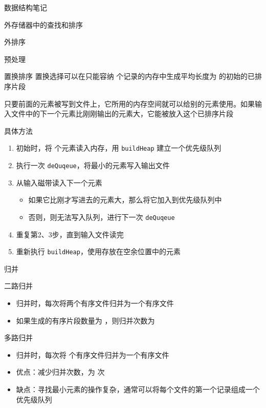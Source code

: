 \documentclass[
  ignorenonframetext,
]{beamer}
\providecommand{\tightlist}{%
  \setlength{\itemsep}{0pt}\setlength{\parskip}{0pt}}
\begin{document}
\begin{frame}[fragile]{数据结构笔记}
\begin{block}{外存储器中的查找和排序}
\begin{block}{外排序}
\begin{block}{预处理}
\begin{block}{置换排序}
\protect{}\label{ux7f6eux6362ux6392ux5e8f}
置换选择可以在只能容纳 {} 个记录的内存中生成平均长度为 {}
的初始的已排序片段

只要前面的元素被写到文件上，它所用的内存空间就可以给别的元素使用。如果输入文件中的下一个元素比刚刚输出的元素大，它能被放入这个已排序片段

具体方法

\begin{enumerate}
\tightlist
\item
  初始时，将 {} 个元素读入内存，用 \texttt{buildHeap} 建立一个优先级队列
\item
  执行一次 \texttt{deQuqeue}，将最小的元素写入输出文件
\item
  从输入磁带读入下一个元素

  \begin{itemize}
  \tightlist
  \item
    如果它比刚才写进去的元素大，那么将它加入到优先级队列中
  \item
    否则，则无法写入队列，进行下一次 \texttt{deQuqeue}
  \end{itemize}
\item
  重复第2、3步，直到输入文件读完
\item
  重新执行 \texttt{buildHeap}，使用存放在空余位置中的元素
\end{enumerate}
\end{block}
\end{block}

\begin{block}{归并}
\protect{}\label{ux5f52ux5e76}
\begin{block}{二路归并}
\protect{}\label{ux4e8cux8defux5f52ux5e76}
\begin{itemize}
\tightlist
\item
  归并时，每次将两个有序文件归并为一个有序文件
\item
  如果生成的有序片段数量为 {}，则归并次数为 {}
\end{itemize}
\end{block}

\begin{block}{多路归并}
\protect{}\label{ux591aux8defux5f52ux5e76}
\begin{itemize}
\tightlist
\item
  归并时，每次将 {} 个有序文件归并为一个有序文件
\item
  优点：减少归并次数，为 {} 次
\item
  缺点：寻找最小元素的操作复杂，通常可以将每个文件的第一个记录组成一个优先级队列
\end{itemize}
\end{block}


\end{block}
\end{block}
\end{block}
\end{frame}
\end{document}
